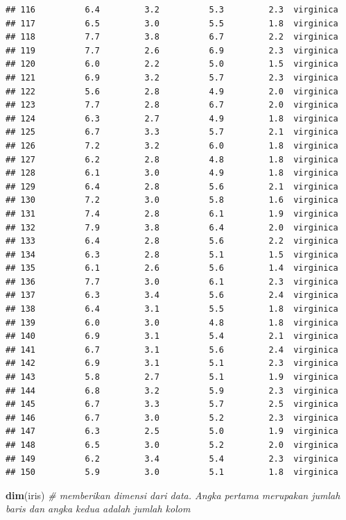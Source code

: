 \documentclass[]{article}
\newenvironment{Shaded}{\begin{snugshade}}{\end{snugshade}}
\newcommand{\KeywordTok}[1]{\textcolor[rgb]{0.13,0.29,0.53}{\textbf{#1}}}
\newcommand{\CommentTok}[1]{\textcolor[rgb]{0.56,0.35,0.01}{\textit{#1}}}
\newcommand{\NormalTok}[1]{#1}
\begin{document}
\begin{verbatim}
## 116          6.4         3.2          5.3         2.3  virginica
## 117          6.5         3.0          5.5         1.8  virginica
## 118          7.7         3.8          6.7         2.2  virginica
## 119          7.7         2.6          6.9         2.3  virginica
## 120          6.0         2.2          5.0         1.5  virginica
## 121          6.9         3.2          5.7         2.3  virginica
## 122          5.6         2.8          4.9         2.0  virginica
## 123          7.7         2.8          6.7         2.0  virginica
## 124          6.3         2.7          4.9         1.8  virginica
## 125          6.7         3.3          5.7         2.1  virginica
## 126          7.2         3.2          6.0         1.8  virginica
## 127          6.2         2.8          4.8         1.8  virginica
## 128          6.1         3.0          4.9         1.8  virginica
## 129          6.4         2.8          5.6         2.1  virginica
## 130          7.2         3.0          5.8         1.6  virginica
## 131          7.4         2.8          6.1         1.9  virginica
## 132          7.9         3.8          6.4         2.0  virginica
## 133          6.4         2.8          5.6         2.2  virginica
## 134          6.3         2.8          5.1         1.5  virginica
## 135          6.1         2.6          5.6         1.4  virginica
## 136          7.7         3.0          6.1         2.3  virginica
## 137          6.3         3.4          5.6         2.4  virginica
## 138          6.4         3.1          5.5         1.8  virginica
## 139          6.0         3.0          4.8         1.8  virginica
## 140          6.9         3.1          5.4         2.1  virginica
## 141          6.7         3.1          5.6         2.4  virginica
## 142          6.9         3.1          5.1         2.3  virginica
## 143          5.8         2.7          5.1         1.9  virginica
## 144          6.8         3.2          5.9         2.3  virginica
## 145          6.7         3.3          5.7         2.5  virginica
## 146          6.7         3.0          5.2         2.3  virginica
## 147          6.3         2.5          5.0         1.9  virginica
## 148          6.5         3.0          5.2         2.0  virginica
## 149          6.2         3.4          5.4         2.3  virginica
## 150          5.9         3.0          5.1         1.8  virginica
\end{verbatim}

\begin{Shaded}
\begin{Highlighting}[]
\KeywordTok{dim}\NormalTok{(iris) }\CommentTok{# memberikan dimensi dari data. Angka pertama merupakan jumlah baris dan angka kedua adalah jumlah kolom}
\end{Highlighting}
\end{Shaded}
\end{document}
